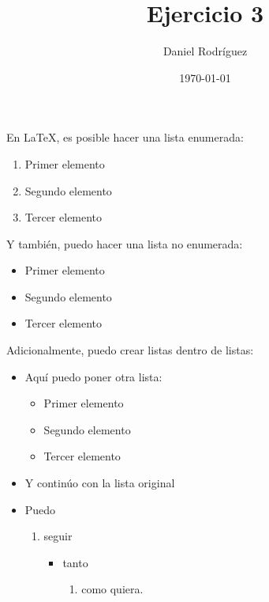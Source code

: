 \documentclass{article}
\title{Ejercicio 3}
\author{Daniel Rodríguez}
\date{\today}
\begin{document}
\maketitle

En \LaTeX, es posible hacer una lista enumerada:
\begin{enumerate}
\item Primer elemento
\item Segundo elemento
\item Tercer elemento
\end{enumerate}

Y también, puedo hacer una lista no enumerada:
\begin{itemize}
\item Primer elemento
\item Segundo elemento
\item Tercer elemento
\end{itemize}

Adicionalmente, puedo crear listas dentro de listas:
\begin{itemize}
\item Aquí puedo poner otra lista:
    \begin{itemize}
    \item Primer elemento
    \item Segundo elemento
    \item Tercer elemento
    \end{itemize}
\item Y continúo con la lista original
\item Puedo
    \begin{enumerate}
    \item seguir
        \begin{itemize}
        \item tanto
            \begin{enumerate}
            \item como quiera.
            \end{enumerate}
        \end{itemize}
    \end{enumerate}
\end{itemize}
\end{document}
